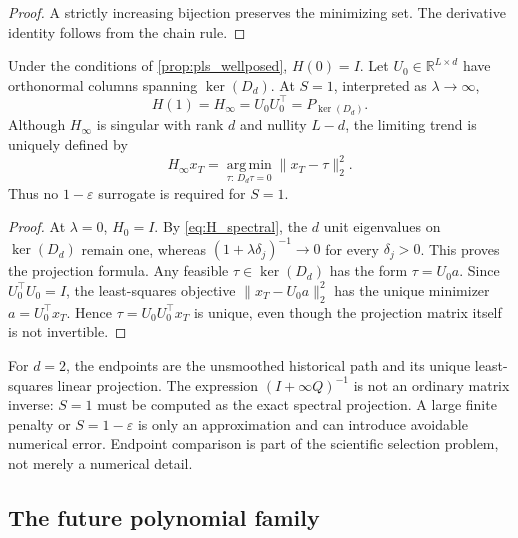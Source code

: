 \begin{proof}
A strictly increasing bijection preserves the minimizing set. The derivative identity follows from the chain rule.
\end{proof}

\begin{proposition}
\label{prop:endpoints}
Under the conditions of \cref{prop:pls_wellposed}, $H(0)=I$.
Let $U_0\in\mathbb R^{L\times d}$ have orthonormal columns spanning
$\ker(D_d)$. At $S=1$, interpreted as $\lambda\to\infty$,
\begin{equation}
\label{eq:exact_limiting_projection}
H(1)=H_\infty=U_0U_0^\top=P_{\ker(D_d)}.
\end{equation}
Although $H_\infty$ is singular with rank $d$ and nullity $L-d$,
the limiting trend is uniquely defined by
\begin{equation}
\label{eq:exact_limiting_constrained_fit}
H_\infty x_T
=\operatorname*{arg\,min}_{\tau:\,D_d\tau=0}
\|x_T-\tau\|_2^2.
\end{equation}
Thus no $1-\varepsilon$ surrogate is required for $S=1$.
\end{proposition}

\begin{proof}
At $\lambda=0$, $H_0=I$. By \cref{eq:H_spectral}, the
$d$ unit eigenvalues on $\ker(D_d)$ remain one, whereas
$(1+\lambda\delta_j)^{-1}\to0$ for every $\delta_j>0$.
This proves the projection formula. Any feasible
$\tau\in\ker(D_d)$ has the form $\tau=U_0a$.
Since $U_0^\top U_0=I$, the least-squares objective
$\|x_T-U_0a\|_2^2$ has the unique minimizer
$a=U_0^\top x_T$. Hence $\tau=U_0U_0^\top x_T$ is unique,
even though the projection matrix itself is not invertible.
\end{proof}

For $d=2$, the endpoints are the unsmoothed historical path and
its unique least-squares linear projection. The expression
$(I+\infty Q)^{-1}$ is not an ordinary matrix inverse:
$S=1$ must be computed as the exact spectral projection.
A large finite penalty or $S=1-\varepsilon$ is only an
approximation and can introduce avoidable numerical error.
Endpoint comparison is part of the scientific selection problem,
not merely a numerical detail.

\subsection{The future polynomial family}

